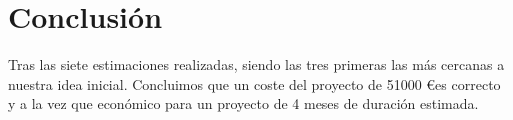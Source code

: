 \section{Conclusión}

Tras las siete estimaciones realizadas, siendo las tres primeras las más cercanas a nuestra idea inicial. Concluimos que un coste del proyecto de 51000 \euro es correcto y a la vez que económico para un proyecto de 4 meses de duración estimada.



%
%

       

